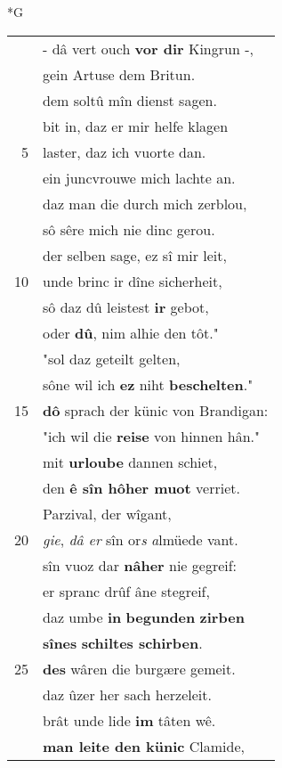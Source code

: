 \documentclass[8pt,a4paper,notitlepage]{article}
\begin{document}
\begin{table}[ht]
\begin{minipage}[t]{0.5\linewidth}
\small
\begin{center}*G
\end{center}
\begin{tabular}{rl}
 & - dâ vert ouch \textbf{vor dir} Kingrun -,\\ 
 & gein Artuse dem Britun.\\ 
 & dem soltû mîn dienst sagen.\\ 
 & bit in, daz er mir helfe klagen\\ 
5 & laster, daz ich vuorte dan.\\ 
 & ein juncvrouwe mich lachte an.\\ 
 & daz man die durch mich zerblou,\\ 
 & sô sêre mich nie dinc gerou.\\ 
 & der selben sage, ez sî mir leit,\\ 
10 & unde brinc ir dîne sicherheit,\\ 
 & sô daz dû leistest \textbf{ir} gebot,\\ 
 & oder \textbf{dû}, nim alhie den tôt."\\ 
 & "sol daz geteilt gelten,\\ 
 & sône wil ich \textbf{ez} niht \textbf{beschelten}."\\ 
15 & \textbf{dô} sprach der künic von Brandigan:\\ 
 & "ich wil die \textbf{reise} von hinnen hân."\\ 
 & mit \textbf{urloube} dannen schiet,\\ 
 & den \textbf{ê sîn hôher muot} verriet.\\ 
 & Parzival, der wîgant,\\ 
20 & \textit{gie}, \textit{dâ er} sîn or\textit{s} \textit{a}lmüede vant.\\ 
 & sîn vuoz dar \textbf{nâher} nie gegreif:\\ 
 & er spranc drûf âne stegreif,\\ 
 & daz umbe \textbf{in} \textbf{begunden} \textbf{zirben}\\ 
 & \textbf{sînes} \textbf{schiltes schirben}.\\ 
25 & \textbf{des} wâren die burgære gemeit.\\ 
 & daz ûzer her sach herzeleit.\\ 
 & brât unde lide \textbf{im} tâten wê.\\ 
 & \textbf{man leite den künic} Clamide,\\ 

\end{tabular}
\end{minipage}
\end{table}
\end{document}
